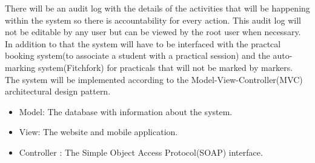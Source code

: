 \documentclass[11pt,a4paper]{article}
\begin{document}
There will be an audit log with the details of the activities that will be happening within the system so there is accountability for every action. This audit log will not be editable by any user but can be viewed by the root user when necessary.\\

In addition to that the system will have to be interfaced with the practcal booking system(to associate a student with a practical session)
and the auto-marking system(Fitchfork) for practicals that will not be marked by markers.\\

The system will be implemented according to the Model-View-Controller(MVC) architectural design pattern. \\
\begin{itemize}
\item Model:		 The database with information about the system.
\item View: 		 The website and mobile application.
\item Controller :   The Simple Object Access Protocol(SOAP) interface.
\end{itemize}

 
\end{document}
